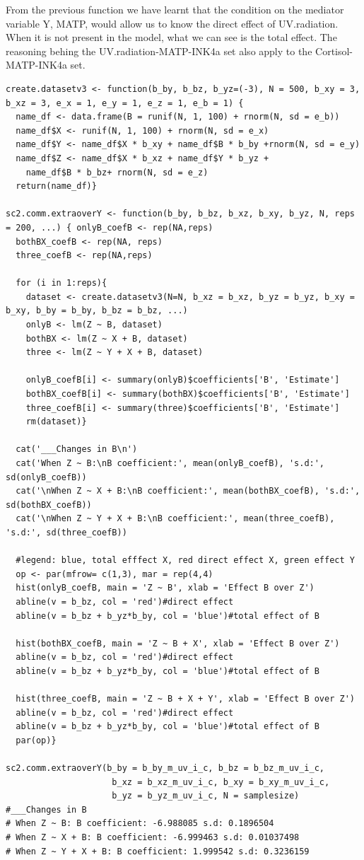 \documentclass{article}
\begin{document}
From the previous function we have learnt that the condition on the mediator variable Y, MATP, would allow us to know the direct effect of UV.radiation. When it is not present in the model, what we can see is the total effect. The reasoning behing the UV.radiation-MATP-INK4a set also apply to the Cortisol-MATP-INK4a set.\par

\begin{lstlisting}
create.datasetv3 <- function(b_by, b_bz, b_yz=(-3), N = 500, b_xy = 3, b_xz = 3, e_x = 1, e_y = 1, e_z = 1, e_b = 1) {
  name_df <- data.frame(B = runif(N, 1, 100) + rnorm(N, sd = e_b))
  name_df$X <- runif(N, 1, 100) + rnorm(N, sd = e_x)
  name_df$Y <- name_df$X * b_xy + name_df$B * b_by +rnorm(N, sd = e_y)
  name_df$Z <- name_df$X * b_xz + name_df$Y * b_yz + 
    name_df$B * b_bz+ rnorm(N, sd = e_z)
  return(name_df)}

sc2.comm.extraoverY <- function(b_by, b_bz, b_xz, b_xy, b_yz, N, reps = 200, ...) { onlyB_coefB <- rep(NA,reps)
  bothBX_coefB <- rep(NA, reps)
  three_coefB <- rep(NA,reps)
  
  for (i in 1:reps){
    dataset <- create.datasetv3(N=N, b_xz = b_xz, b_yz = b_yz, b_xy = b_xy, b_by = b_by, b_bz = b_bz, ...)
    onlyB <- lm(Z ~ B, dataset)
    bothBX <- lm(Z ~ X + B, dataset)
    three <- lm(Z ~ Y + X + B, dataset)
    
    onlyB_coefB[i] <- summary(onlyB)$coefficients['B', 'Estimate']
    bothBX_coefB[i] <- summary(bothBX)$coefficients['B', 'Estimate']
    three_coefB[i] <- summary(three)$coefficients['B', 'Estimate']
    rm(dataset)}

  cat('___Changes in B\n')
  cat('When Z ~ B:\nB coefficient:', mean(onlyB_coefB), 's.d:', sd(onlyB_coefB))
  cat('\nWhen Z ~ X + B:\nB coefficient:', mean(bothBX_coefB), 's.d:', sd(bothBX_coefB))
  cat('\nWhen Z ~ Y + X + B:\nB coefficient:', mean(three_coefB), 's.d:', sd(three_coefB))
  
  #legend: blue, total efffect X, red direct effect X, green effect Y
  op <- par(mfrow= c(1,3), mar = rep(4,4)
  hist(onlyB_coefB, main = 'Z ~ B', xlab = 'Effect B over Z')
  abline(v = b_bz, col = 'red')#direct effect
  abline(v = b_bz + b_yz*b_by, col = 'blue')#total effect of B
  
  hist(bothBX_coefB, main = 'Z ~ B + X', xlab = 'Effect B over Z')
  abline(v = b_bz, col = 'red')#direct effect
  abline(v = b_bz + b_yz*b_by, col = 'blue')#total effect of B
  
  hist(three_coefB, main = 'Z ~ B + X + Y', xlab = 'Effect B over Z')
  abline(v = b_bz, col = 'red')#direct effect
  abline(v = b_bz + b_yz*b_by, col = 'blue')#total effect of B
  par(op)}

sc2.comm.extraoverY(b_by = b_by_m_uv_i_c, b_bz = b_bz_m_uv_i_c,
                     b_xz = b_xz_m_uv_i_c, b_xy = b_xy_m_uv_i_c,
                     b_yz = b_yz_m_uv_i_c, N = samplesize)
#___Changes in B
# When Z ~ B: B coefficient: -6.988085 s.d: 0.1896504
# When Z ~ X + B: B coefficient: -6.999463 s.d: 0.01037498
# When Z ~ Y + X + B: B coefficient: 1.999542 s.d: 0.3236159
\end{lstlisting}
\end{document}
